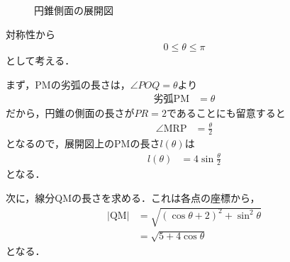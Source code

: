 \documentclass[a4paper,10pt]{ltjsarticle}
\begin{document}
\begin{multicols}{2}
\begin{figure}[H]
    \caption{円錐側面の展開図}
    \label{fig:3}
  \end{figure}

  対称性から
  \begin{align}
    0 \le \theta \le \pi \label{eq:4}
  \end{align}
  として考える．

  まず，PMの劣弧の長さは，$\angle POQ=\theta$より
  \begin{align*}
    \text{劣弧PM} & = \theta
  \end{align*}
  だから，円錐の側面の長さが$PR=2$であることにも留意すると
  \begin{align*}
    \angle \text{MRP} & = \frac{\theta}{2}
  \end{align*}
  となるので，展開図上のPMの長さ$l(\theta)$は
  \begin{align}
    l(\theta) & = 4 \sin \frac{\theta}{2} \label{eq:2}
  \end{align}
  となる．

  次に，線分QMの長さを求める．これは各点の座標から，
  \begin{align}
    |\text{QM}|
     & = \sqrt{(\cos\theta+2)^2 + \sin^2\theta} \\
     & = \sqrt{5+4\cos\theta} \label{eq:3}
  \end{align}
  となる．


\end{multicols}
\end{document}
